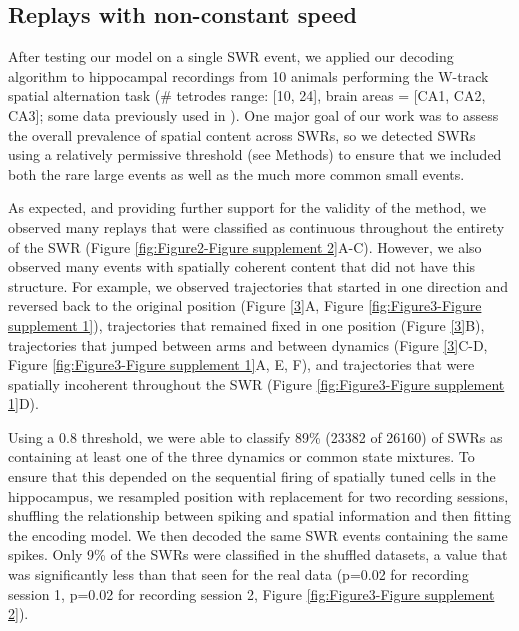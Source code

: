 \documentclass[times, twoside]{zHenriquesLab-StyleBioRxiv}
\begin{document}
\subsection*{Replays with non-constant speed}

After testing our model on a single SWR event, we applied our decoding algorithm to hippocampal recordings from 10 animals performing the W-track spatial alternation task (\# tetrodes range: [10, 24], brain areas = [CA1, CA2, CA3]; some data previously used in \cite{KarlssonAwakereplayremote2009, KayConstantSubsecondCycling2020, CarrTransientSlowGamma2012}). One major goal of our work was to assess the overall prevalence of spatial content across SWRs, so we detected SWRs using a relatively permissive threshold (see Methods) to ensure that we included both the rare large events as well as the much more common small events. 

As expected, and providing further support for the validity of the method, we observed many replays that were classified as continuous throughout the entirety of the SWR (Figure \ref{fig:Figure2-Figure supplement 2}A-C). However, we also observed many events with spatially coherent content that did not have this structure. For example, we observed trajectories that started in one direction and reversed back to the original position (Figure \ref{3}A, Figure \ref{fig:Figure3-Figure supplement 1}), trajectories that remained fixed in one position (Figure \ref{3}B), trajectories that jumped between arms and between dynamics (Figure \ref{3}C-D, Figure \ref{fig:Figure3-Figure supplement 1}A, E, F), and trajectories that were spatially incoherent throughout the SWR (Figure \ref{fig:Figure3-Figure supplement 1}D).

Using a 0.8 threshold, we were able to classify 89\% (23382 of 26160) of SWRs as containing at least one of the three dynamics or common state mixtures. To ensure that this depended on the sequential firing of spatially tuned cells in the hippocampus, we resampled position with replacement for two recording sessions, shuffling the relationship between spiking and spatial information and then fitting the encoding model. We then decoded the same SWR events containing the same spikes. Only 9\% of the SWRs were classified in the shuffled datasets, a value that was significantly less than that seen for the real data (p=0.02 for recording session 1, p=0.02 for recording session 2, Figure \ref{fig:Figure3-Figure supplement 2}).
\end{document}
